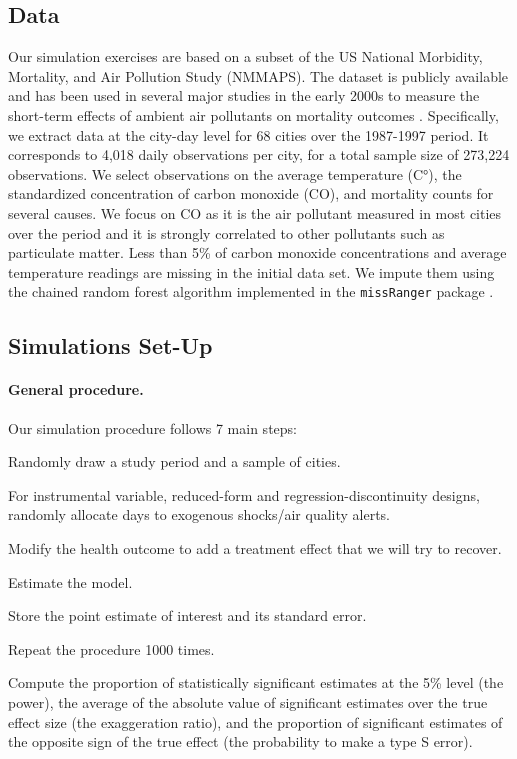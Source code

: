 \documentclass[12pt]{article}
\newenvironment{senumerate}{\enumerate\addtolength{\itemsep}{-10pt}}{\endenumerate} %
\begin{document}
        \subsection{Data}
        
        Our simulation exercises are based on a subset of the US National Morbidity, Mortality, and Air Pollution Study (NMMAPS). The dataset is publicly available and has been used in several major studies in the early 2000s to measure the short-term effects of ambient air pollutants on mortality outcomes \citep{peng2008statistical}. Specifically, we extract data at the city-day level for 68 cities over the 1987-1997 period. It corresponds to 4,018 daily observations per city, for a total sample size of 273,224 observations. We select observations on the average temperature (C°), the standardized concentration of carbon monoxide (CO), and mortality counts for several causes. We focus on CO as it is the air pollutant measured in most cities over the period and it is strongly correlated to other pollutants such as particulate matter. Less than 5\% of carbon monoxide concentrations and average temperature readings are missing in the initial data set. We impute them using the chained random forest algorithm implemented in the \texttt{missRanger} package \citep{mayer_missranger_2019}.
        
        \subsection{Simulations Set-Up}
        
        \paragraph{General procedure.} Our simulation procedure follows 7 main steps:

        \begin{senumerate}
            \item Randomly draw a study period and a sample of cities.
            \item For instrumental variable, reduced-form and regression-discontinuity designs, randomly allocate days to exogenous shocks/air quality alerts.
            \item Modify the health outcome to add a treatment effect that we will try to recover.
            \item Estimate the model.
            \item Store the point estimate of interest and its standard error.
            \item Repeat the procedure 1000 times.
            \item Compute the proportion of statistically significant estimates at the 5\% level (the power), the average of the absolute value of significant estimates over the true effect size (the exaggeration ratio), and the proportion of significant estimates of the opposite sign of the true effect (the probability to make a type S error). 
        \end{senumerate}
        
\end{document}

